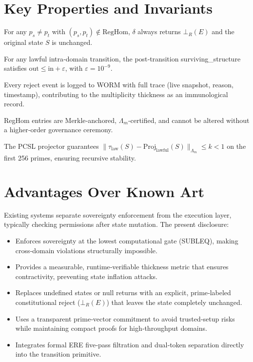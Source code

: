 \documentclass[11pt,a4paper]{article}
\theoremstyle{definition}
\theoremstyle{remark}
\begin{document}
\section{Key Properties and Invariants}
\label{sec:properties}
\begin{property}
For any $p_s \neq p_t$ with $(p_s, p_t) \notin \text{RegHom}$, $\delta$ always returns $\bot_R(E)$ and the original state $S$ is unchanged.
\end{property}

\begin{property}
For any lawful intra‑domain transition, the post‑transition surviving\_structure satisfies $\text{out} \le \text{in} + \varepsilon$, with $\varepsilon = 10^{-9}$.
\end{property}

\begin{property}
Every reject event is logged to WORM with full trace (live snapshot, reason, timestamp), contributing to the multiplicity thickness as an immunological record.
\end{property}

\begin{property}
RegHom entries are Merkle‑anchored, $\Lambda_m$‑certified, and cannot be altered without a higher‑order governance ceremony.
\end{property}

\begin{property}
The PCSL projector guarantees $\|\tau_\text{law}(S) - \text{Proj}_\text{lawful}(S)\|_{\Lambda_m} \le k < 1$ on the first 256 primes, ensuring recursive stability.
\end{property}

\section{Advantages Over Known Art}
\label{sec:advantages}
Existing systems separate sovereignty enforcement from the execution layer, typically checking permissions after state mutation. The present disclosure:
\begin{itemize}[noitemsep]
    \item Enforces sovereignty at the lowest computational gate (SUBLEQ), making cross‑domain violations structurally impossible.
    \item Provides a measurable, runtime‑verifiable thickness metric that ensures contractivity, preventing state inflation attacks.
    \item Replaces undefined states or null returns with an explicit, prime‑labeled constitutional reject ($\bot_R(E)$) that leaves the state completely unchanged.
    \item Uses a transparent prime‑vector commitment to avoid trusted‑setup risks while maintaining compact proofs for high‑throughput domains.
    \item Integrates formal ERE five‑pass filtration and dual‑token separation directly into the transition primitive.
\end{itemize}
\end{document}
